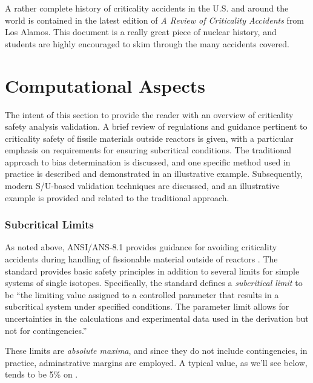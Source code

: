 A rather complete history of criticality accidents in the U.S. and
around the world is contained in the latest edition of
 \textit{A Review of Criticality Accidents} from Los Alamos.  This
document is a really great piece of nuclear history, and students
are highly encouraged to skim through the many accidents covered.


\section*{Computational Aspects}

The intent of this section to provide the reader with an 
overview of criticality safety analysis validation. A brief 
review of regulations and guidance pertinent to criticality safety of 
fissile materials outside reactors is given, with a particular emphasis on 
requirements for ensuring subcritical conditions. The traditional approach to 
bias determination is discussed, and one specific method used in practice
is described and demonstrated in an illustrative example. Subsequently, 
modern S/U-based validation techniques are discussed, and an 
illustrative example is provided and related to the traditional approach.


\subsubsection{Subcritical Limits}

As noted above, ANSI/ANS-8.1 provides guidance 
for avoiding criticality accidents during handling of fissionable material 
outside of reactors \cite{ans8_1}. The standard provides basic safety principles 
in addition to several limits for simple systems of single isotopes.  
Specifically, the standard defines a \textit{subcritical limit} to be ``the 
limiting value assigned to a controlled parameter that results in a subcritical 
system under specified conditions. The parameter limit allows for 
uncertainties in the calculations and experimental data used in the derivation 
but not for contingencies.''

These limits are \textit{absolute maxima}, and since they do not include 
contingencies, in practice, adminstrative margins are employed.  A typical 
value, as we'll see below, tends to be 5\% on \keff.

